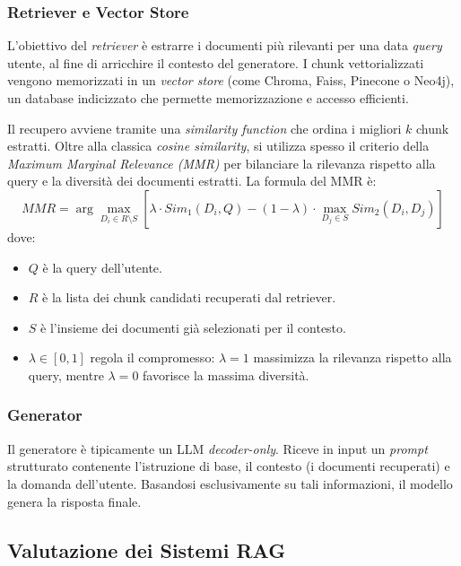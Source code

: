         \subsubsection{Retriever e Vector Store}
        
            L'obiettivo del \textit{retriever} è estrarre i documenti più rilevanti per una data \textit{query} utente, al fine di arricchire il contesto del generatore. I chunk vettorializzati vengono memorizzati in un \textit{vector store} (come Chroma, Faiss, Pinecone o Neo4j), un database indicizzato che permette memorizzazione e accesso efficienti.

            Il recupero avviene tramite una \textit{similarity function} che ordina i migliori $k$ chunk estratti. Oltre alla classica \textit{cosine similarity}, si utilizza spesso il criterio della \textit{Maximum Marginal Relevance (MMR)} per bilanciare la rilevanza rispetto alla query e la diversità dei documenti estratti. La formula del MMR è:
            $$MMR = \arg\max_{D_i \in R \setminus S} \left[ \lambda \cdot Sim_1(D_i, Q) - (1 - \lambda) \cdot \max_{D_j \in S} Sim_2(D_i, D_j) \right]$$
            dove:
            
            \begin{itemize}
                \item $Q$ è la query dell'utente.
                \item $R$ è la lista dei chunk candidati recuperati dal retriever.
                \item $S$ è l'insieme dei documenti già selezionati per il contesto.
                \item $\lambda \in [0, 1]$ regola il compromesso: $\lambda = 1$ massimizza la rilevanza rispetto alla query, mentre $\lambda = 0$ favorisce la massima diversità.
            \end{itemize}

        \subsubsection{Generator}
        
            Il generatore è tipicamente un LLM \textit{decoder-only}. Riceve in input un \textit{prompt} strutturato contenente l'istruzione di base, il contesto (i documenti recuperati) e la domanda dell'utente. Basandosi esclusivamente su tali informazioni, il modello genera la risposta finale.

    \newpage

    \subsection{Valutazione dei Sistemi RAG}
    
